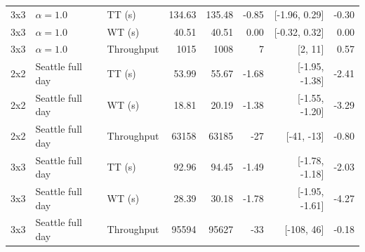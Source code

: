 \begin{table}[htbp]
{\begin{tabular}{lllrrrrr}
3x3 & $\alpha=1.0$ & TT (s) & 134.63 & 135.48 & -0.85 & [-1.96, 0.29] & -0.30 \\
3x3 & $\alpha=1.0$ & WT (s) & 40.51 & 40.51 & 0.00 & [-0.32, 0.32] & 0.00 \\
3x3 & $\alpha=1.0$ & Throughput & 1015 & 1008 & 7 & [2, 11] & 0.57 \\
\addlinespace
2x2 & Seattle full day & TT (s) & 53.99 & 55.67 & -1.68 & [-1.95, -1.38] & -2.41 \\
2x2 & Seattle full day & WT (s) & 18.81 & 20.19 & -1.38 & [-1.55, -1.20] & -3.29 \\
2x2 & Seattle full day & Throughput & 63158 & 63185 & -27 & [-41, -13] & -0.80 \\
\addlinespace
3x3 & Seattle full day & TT (s) & 92.96 & 94.45 & -1.49 & [-1.78, -1.18] & -2.03 \\
3x3 & Seattle full day & WT (s) & 28.39 & 30.18 & -1.78 & [-1.95, -1.61] & -4.27 \\
3x3 & Seattle full day & Throughput & 95594 & 95627 & -33 & [-108, 46] & -0.18 \\
\bottomrule
\end{tabular}
}
\end{table}


\begin{table}[htbp]
\centering
\scriptsize
\setlength{\tabcolsep}{4pt}
\caption{Exact-search and QAOA solution quality at $\alpha=0.7$. Because the traffic state and Hamiltonian change during a simulation, exact minimum and QAOA energies are means of the run-level decision-averaged energies, not one fixed Hamiltonian value. The gap median is the median of run-level average gaps. Recovery intervals are percentile-bootstrap 95\% CIs across 20 independent runs.}
\label{tab:qaoa-exact-optimization-quality}
\end{table}


